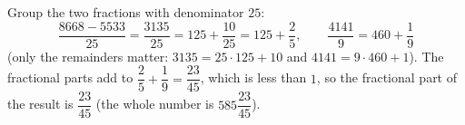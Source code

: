 Group the two fractions with denominator $25$:
\[
\dfrac{8668-5533}{25}=\dfrac{3135}{25}=125+\dfrac{10}{25}=125+\dfrac{2}{5},\qquad \dfrac{4141}{9}=460+\dfrac{1}{9}
\]
(only the remainders matter: $3135=25\cdot125+10$ and $4141=9\cdot460+1$). The fractional parts add to $\dfrac{2}{5}+\dfrac{1}{9}=\dfrac{23}{45}$, which is less than $1$, so the fractional part of the result is $\boxed{\dfrac{23}{45}}$ (the whole number is $585\dfrac{23}{45}$).
